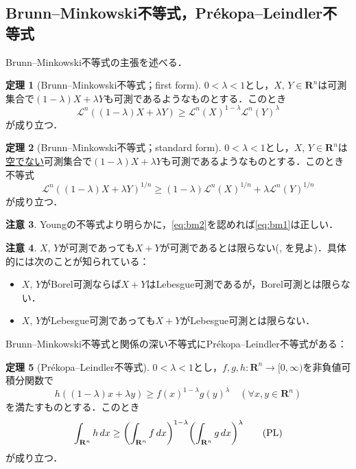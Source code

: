 \documentclass[a4j]{ltjsarticle}
\newcommand{\Rset}{\mathbf{R}}
\newcommand{\Lm}{\mathcal{L}}
\newcommand{\1}{\bm{1}}
\numberwithin{equation}{section}
\theoremstyle{definition}
\newtheorem{thm}{定理}[section]
\newtheorem{rmk}[thm]{注意}
\begin{document}
\subsection{Brunn--Minkowski不等式，Pr\'ekopa--Leindler不等式}
Brunn--Minkowski不等式の主張を述べる．
\begin{thm}[Brunn--Minkowski不等式；first form]\label{thm:bm1}
    $0<\lambda<1$とし，$X,\,Y\in \Rset^n$は可測集合で$(1-\lambda)X+\lambda Y$も可測であるようなものとする．このとき
    \begin{equation}
        \Lm^n((1-\lambda)X+\lambda Y)\geq \Lm^n(X)^{1-\lambda}\Lm^n(Y)^{\lambda}\label{eq:bm1}\tag{BM1}
    \end{equation}
    が成り立つ．
\end{thm}
\begin{thm}[Brunn--Minkowski不等式；standard form]\label{thm:bm2}
    $0<\lambda<1$とし，$X,\,Y\in \Rset^n$は\underline{空でない}可測集合で$(1-\lambda)X+\lambda Y$も可測であるようなものとする．このとき不等式
    \begin{equation}
        \Lm^n((1-\lambda)X+\lambda Y)^{1/n}\geq (1-\lambda)\Lm^n(X)^{1/n}+\lambda \Lm^n(Y)^{1/n}\label{eq:bm2}\tag{BM2}
    \end{equation}
    が成り立つ．
\end{thm}
\begin{rmk}
    Youngの不等式より明らかに，\eqref{eq:bm2}を認めれば\eqref{eq:bm1}は正しい．
\end{rmk}
\begin{rmk}\label{rmk:measurability}
    $X,\,Y$が可測であっても$X+Y$が可測であるとは限らない(\cite{S}, \cite{ES}を見よ)．具体的には次のことが知られている：
    \begin{itemize}
        \item $X,\,Y$がBorel可測ならば$X+Y$はLebesgue可測であるが，Borel可測とは限らない．
        \item $X,\,Y$がLebesgue可測であっても$X+Y$がLebesgue可測とは限らない．
    \end{itemize}
\end{rmk}
Brunn--Minkowski不等式と関係の深い不等式にPr\'ekopa--Leindler不等式がある：
\begin{thm}[Pr\'ekopa--Leindler不等式]\label{thm:pl}
    $0<\lambda<1$とし，$f,g,h\colon \Rset^n\to[0,\infty)$を非負値可積分関数で
    \begin{equation}
        h((1-\lambda)x+\lambda y)\geq f(x)^{1-\lambda}g(y)^{\lambda}\quad (\forall x,y\in \Rset^n)
    \end{equation}
    を満たすものとする．このとき
    \begin{equation}
        \int_{\Rset^n}h\,dx\geq \qty(\int_{\Rset^n}f\,dx)^{1-\lambda}\qty(\int_{\Rset^n}g\,dx)^{\lambda}\label{eq:pl}\tag{PL}
    \end{equation}
    が成り立つ．
\end{thm}
\end{document}
